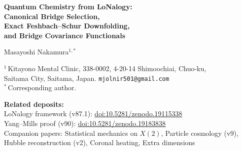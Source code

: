 \documentclass[12pt]{article}
\theoremstyle{plain}
\theoremstyle{definition}
\numberwithin{equation}{section}
\newcommand{\br}{\mathrm{br}}
\newcommand{\eff}{\mathrm{eff}}
\DeclareMathOperator{\Ran}{Ran}
\DeclareMathOperator{\Cov}{Cov}
\begin{document}
\begin{titlepage}
\centering
\vspace*{0.8cm}

{\LARGE\bfseries Quantum Chemistry from LoNalogy:\\[6pt]
Canonical Bridge Selection,\\[6pt]
Exact Feshbach--Schur Downfolding,\\[6pt]
and Bridge Covariance Functionals}

\vspace{1.2cm}

{\large Masayoshi Nakamura$^{1,*}$}

\vspace{0.6cm}

{\normalsize
$^1$\,Kitayono Mental Clinic,
338-0002, 4-20-14 Shimoochiai, Chuo-ku,\\
Saitama City, Saitama, Japan.
\texttt{mjolnir501@gmail.com}\\[4pt]
$^*$\,Corresponding author.
}

\vspace{0.6cm}

{\small
\noindent\textbf{Related deposits:}\\
LoNalogy framework (v87.1):
\href{https://doi.org/10.5281/zenodo.19115338}{doi:10.5281/zenodo.19115338}\\
Yang--Mills proof (v90):
\href{https://doi.org/10.5281/zenodo.19183838}{doi:10.5281/zenodo.19183838}\\
Companion papers: Statistical mechanics on $X(2)$,
Particle cosmology (v9), Hubble reconstruction (v2),
Coronal heating, Extra dimensions
}

\vspace{0.8cm}

\begin{abstract}
\noindent
We apply the LoNalogy three-sector framework to quantum chemistry.
Three results are established with complete proofs:

\textbf{(A) Canonical bridge selection and exact downfolding.}
Given any active-space projector $P_A$, the bridge projector
$P_B:=\Pi_{\Ran(QHP_A)}$ is canonically defined, yielding an exact
three-sector Hamiltonian with $P_A H P_I=0$.  The exact
energy-dependent effective Hamiltonian
$H_A^{\eff}(E)=H_{AA}-H_{AB}(H_{BB}-E-\Sigma_B(E))^{-1}H_{BA}$
is the algebraic parent of CASPT2, NEVPT2, and DUCC.
A static generalised eigenproblem closure is derived.

\textbf{(B) System-dependent bridge covariance functional.}
The exact correlation correction from hidden-mode elimination is
the path-integrated bridge covariance
$E_{\br,\mathrm{cov}}[X|X_0]
=-\int_0^1(1-s)\langle\delta X,
\mathcal{C}_{\br}[X_s]\delta X\rangle\,ds$,
where
$\mathcal{C}_{\br}[X]=\beta\,\Cov_X(\Phi_X,\Phi_X)\succeq 0$.
A universal fixed-kernel quadratic $E_{xc}$ is shown to be
incompatible with the derivative discontinuity of exact DFT (no-go).
In the Gaussianised bridge regime, the kernel reduces exactly to
$MD^{-1}M^\top$.


\end{abstract}
\end{titlepage}
\end{document}
